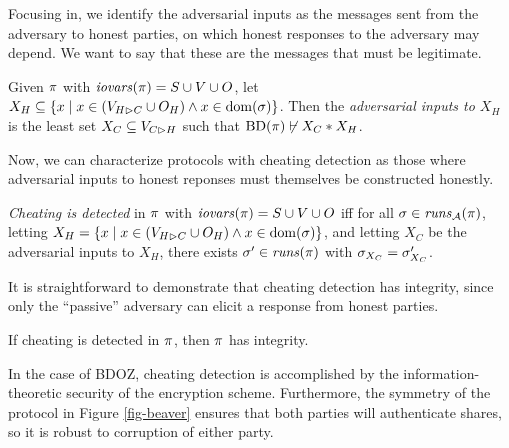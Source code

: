 Focusing in, we identify the adversarial inputs as the messages
sent from the adversary to honest parties, on which honest responses
to the adversary may depend. We want to say that these are the messages
that must be legitimate.
\begin{definition}
  Given $\pi$ with $\mathit{iovars}(\pi) = S \cup V \cup O$,
  let $X_H \subseteq \{ x \mid x \in (V_{H \rhd C} \cup O_H) \wedge x \in \mathrm{dom}(\sigma) \}$.
  Then the \emph{adversarial inputs to $X_H$} is the least set
  $X_C \subseteq V_{C \rhd H}$ such that $\mathrm{BD}(\pi) \not\vdash X_C * X_H$.
\end{definition}
Now, we can characterize protocols with cheating detection as those where
adversarial inputs to honest reponses must themselves be constructed honestly. 
\begin{definition}
  \emph{Cheating is detected} in $\pi$ with $\mathit{iovars}(\pi) = S \cup V \cup O$ iff
  for all  $\sigma \in \mathit{runs}_{\mathcal{A}}(\pi)$,
  letting $X_H = \{ x \mid x \in (V_{H \rhd C} \cup O_H) \wedge x \in \mathrm{dom}(\sigma) \}$,
  and letting $X_C$ be the adversarial inputs to $X_H$,
  there exists $\sigma'\in \mathit{runs}(\pi)$
  with $\sigma_{X_C} = \sigma'_{X_C}$.  
\end{definition}

It is straightforward to demonstrate that cheating detection has integrity,
since only the ``passive'' adversary can elicit a response from honest parties. 
\begin{lemma}
  If cheating is detected in $\pi$, then $\pi$ has integrity.
\end{lemma}

In the case of BDOZ, cheating detection is accomplished by the information-theoretic
security of the encryption scheme\cite{XXX}. Furthermore, the symmetry of
the protocol in Figure \ref{fig-beaver} ensures that both parties will authenticate
shares, so it is robust to corruption of either party. 
